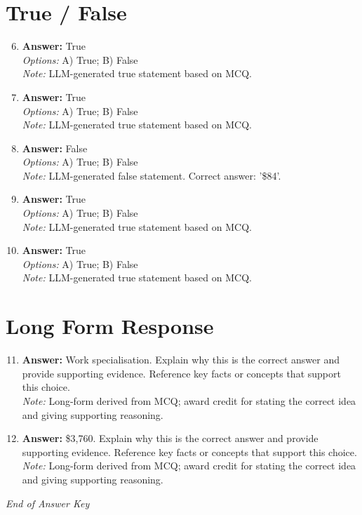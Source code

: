 \documentclass[12pt]{article}
\begin{document}
\section*{True / False}
\begin{enumerate}[label=\arabic*.]
\setcounter{enumi}{5}
\item \textbf{Answer:} True
\\ \textit{Options:} A) True; B) False
\\ \textit{Note:} LLM-generated true statement based on MCQ.
\item \textbf{Answer:} True
\\ \textit{Options:} A) True; B) False
\\ \textit{Note:} LLM-generated true statement based on MCQ.
\item \textbf{Answer:} False
\\ \textit{Options:} A) True; B) False
\\ \textit{Note:} LLM-generated false statement. Correct answer: '\$84'.
\item \textbf{Answer:} True
\\ \textit{Options:} A) True; B) False
\\ \textit{Note:} LLM-generated true statement based on MCQ.
\item \textbf{Answer:} True
\\ \textit{Options:} A) True; B) False
\\ \textit{Note:} LLM-generated true statement based on MCQ.
\end{enumerate}

\section*{Long Form Response}
\begin{enumerate}[label=\arabic*.]
\setcounter{enumi}{10}
\item \textbf{Answer:} Work specialisation. Explain why this is the correct answer and provide supporting evidence. Reference key facts or concepts that support this choice.
\\ \textit{Note:} Long-form derived from MCQ; award credit for stating the correct idea and giving supporting reasoning.
\item \textbf{Answer:} \$3,760. Explain why this is the correct answer and provide supporting evidence. Reference key facts or concepts that support this choice.
\\ \textit{Note:} Long-form derived from MCQ; award credit for stating the correct idea and giving supporting reasoning.
\end{enumerate}

\vfill
\noindent\textit{End of Answer Key}
\end{document}
